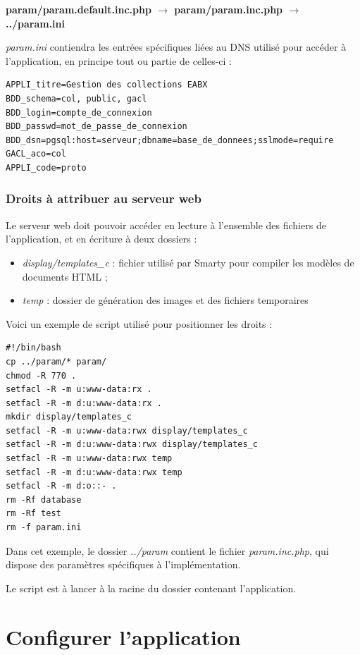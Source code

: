 \textbf{param/param.default.inc.php $\rightarrow$ param/param.inc.php $\rightarrow$ ../param.ini}

\textit{param.ini} contiendra les entrées spécifiques liées au DNS utilisé pour accéder à l'application, en principe tout ou partie de celles-ci :
\begin{lstlisting}
APPLI_titre=Gestion des collections EABX
BDD_schema=col, public, gacl
BDD_login=compte_de_connexion
BDD_passwd=mot_de_passe_de_connexion
BDD_dsn=pgsql:host=serveur;dbname=base_de_donnees;sslmode=require
GACL_aco=col
APPLI_code=proto
\end{lstlisting}



\subsubsection{Droits à attribuer au serveur web}

Le serveur web doit pouvoir accéder en lecture à l'ensemble des fichiers de l'application, et en écriture à deux dossiers :
\begin{itemize}
\item \textit{display/templates\_c} : fichier utilisé par Smarty pour compiler les modèles de documents HTML ;
\item \textit{temp} : dossier de génération des images et des fichiers temporaires
\end{itemize}

Voici un exemple de script utilisé pour positionner les droits :

\begin{lstlisting}
#!/bin/bash
cp ../param/* param/
chmod -R 770 .
setfacl -R -m u:www-data:rx .
setfacl -R -m d:u:www-data:rx .
mkdir display/templates_c
setfacl -R -m u:www-data:rwx display/templates_c
setfacl -R -m d:u:www-data:rwx display/templates_c
setfacl -R -m u:www-data:rwx temp
setfacl -R -m d:u:www-data:rwx temp
setfacl -R -m d:o::- .
rm -Rf database
rm -Rf test
rm -f param.ini
\end{lstlisting}

Dans cet exemple, le dossier \textit{../param} contient le fichier \textit{param.inc.php}, qui dispose des paramètres spécifiques à l'implémentation.

Le script est à lancer à la racine du dossier contenant l'application.

\section{Configurer l'application}

